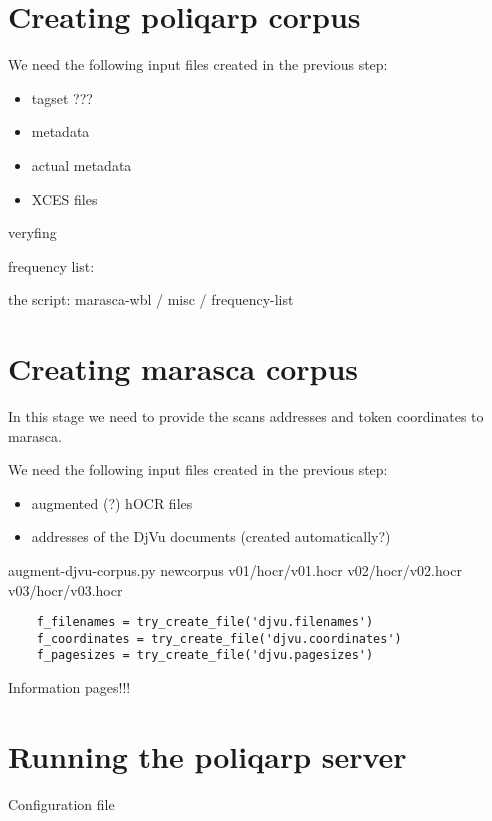 \documentclass{article}
\begin{document}
\section{Creating poliqarp corpus}
\label{sec:creat-poliq-corp-3}

We need the following input files created in the previous step:

\begin{itemize}
\item tagset ???
\item metadata
\item actual metadata
\item XCES files
\end{itemize}


veryfing

frequency list:

the script:  marasca-wbl / misc / frequency-list

\section{Creating marasca corpus}
\label{sec:creat-marasca-corp}

In this stage we need to provide the scans addresses and token
coordinates to marasca.

We need the following input files created in the previous step:

\begin{itemize}
\item augmented (?) hOCR files
\item addresses of the DjVu documents (created automatically?)
\end{itemize}

augment-djvu-corpus.py newcorpus v01/hocr/v01.hocr v02/hocr/v02.hocr v03/hocr/v03.hocr

\begin{verbatim}
    f_filenames = try_create_file('djvu.filenames')
    f_coordinates = try_create_file('djvu.coordinates')
    f_pagesizes = try_create_file('djvu.pagesizes')
\end{verbatim}

Information pages!!!

\section{Running the poliqarp server}
\label{sec:runn-poliq-serv}

Configuration file
\end{document}
